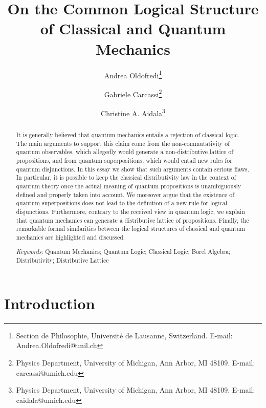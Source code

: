 \documentclass[11pt, executivepaper]{article}
\begin{document}
\title{\textbf{On the Common Logical Structure of Classical and Quantum Mechanics}}

\author{Andrea Oldofredi\thanks{Section de Philosophie, Universit\'e de Lausanne, Switzerland. E-mail: Andrea.Oldofredi@unil.ch} \and Gabriele Carcassi\thanks{Physics Department, University of Michigan, Ann Arbor, MI 48109. E-mail: carcassi@umich.edu} \and Christine A. Aidala\thanks{Physics Department, University of Michigan, Ann Arbor, MI 48109. E-mail: caidala@umich.edu}}


\maketitle

\begin{abstract}
It is generally believed that quantum mechanics entails a rejection of classical logic. The main arguments to support this claim come from the non-commutativity of quantum observables, which allegedly would generate a non-distributive lattice of propositions, and from quantum superpositions, which would entail new rules for quantum disjunctions. In this essay we show that such arguments contain serious flaws.  In particular, it is possible to keep the classical distributivity law in the context of quantum theory once the actual meaning of quantum propositions is unambiguously defined and properly taken into account. We moreover argue that the existence of quantum superpositions does not lead to the definition of a new rule for logical disjunctions. Furthermore, contrary to the received view in quantum logic, we explain that quantum mechanics can generate a distributive lattice of propositions. Finally, the remarkable formal similarities between the logical structures of classical and quantum mechanics are highlighted and discussed. 
\vspace{4mm}

\noindent \emph{Keywords}: Quantum Mechanics; Quantum Logic; Classical Logic; Borel Algebra; Distributivity; Distributive Lattice
\end{abstract}
\vspace{5mm}
\clearpage

\tableofcontents
\vspace{5mm}

\section{Introduction}
\end{document}
